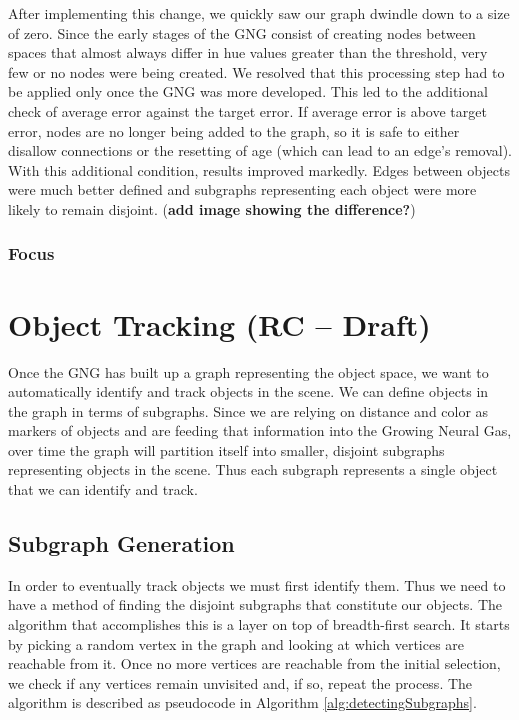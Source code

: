 \documentclass{article}
\renewcommand{\|}{\origbar} %
\begin{document}
After implementing this change, we quickly saw our graph dwindle down to a size of zero. Since the early stages of the GNG consist of creating nodes between spaces that almost always differ in hue values greater than the threshold, very few or no nodes were being created. We resolved that this processing step had to be applied only once the GNG was more developed. This led to the additional check of average error against the target error. If average error is above target error, nodes are no longer being added to the graph, so it is safe to either disallow connections or the resetting of age (which can lead to an edge's removal). With this additional condition, results improved markedly. Edges between objects were much better defined and subgraphs representing each object were more likely to remain disjoint. ({\bf add image showing the difference?})

\subsubsection{Focus}

\section{Object Tracking (RC -- Draft)}

Once the GNG has built up a graph representing the object space, we want to automatically identify and track objects in the scene. We can define objects in the graph in terms of subgraphs. Since we are relying on distance and color as markers of objects and are feeding that information into the Growing Neural Gas, over time the graph will partition itself into smaller, disjoint subgraphs representing objects in the scene. Thus each subgraph represents a single object that we can identify and track.

\subsection{Subgraph Generation}

In order to eventually track objects we must first identify them. Thus we need to have a method of finding the disjoint subgraphs that constitute our objects. The algorithm that accomplishes this is a layer on top of breadth-first search. It starts by picking a random vertex in the graph and looking at which vertices are reachable from it. Once no more vertices are reachable from the initial selection, we check if any vertices remain unvisited and, if so, repeat the process. The algorithm is described as pseudocode in Algorithm \ref{alg:detectingSubgraphs}.
\end{document}
